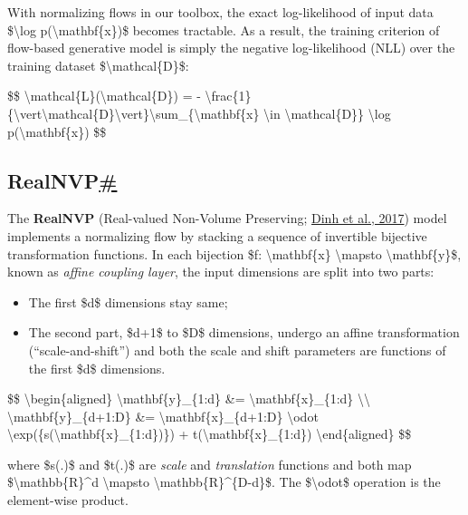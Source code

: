 With normalizing flows in our toolbox, the exact log-likelihood of input data \$\textbackslash log p(\textbackslash mathbf\{x\})\$ becomes tractable. As a result, the training criterion of flow-based generative model is simply the negative log-likelihood (NLL) over the training dataset \$\textbackslash mathcal\{D\}\$:

\$\$ \textbackslash mathcal\{L\}(\textbackslash mathcal\{D\}) = - \textbackslash frac\{1\}\{\textbackslash vert\textbackslash mathcal\{D\}\textbackslash vert\}\textbackslash sum\_\{\textbackslash mathbf\{x\} \textbackslash in \textbackslash mathcal\{D\}\} \textbackslash log p(\textbackslash mathbf\{x\}) \$\$

\subsection{\texorpdfstring{RealNVP\hyperref[realnvp]{\#}}{RealNVP\#}}\label{realnvp}

The \textbf{RealNVP} (Real-valued Non-Volume Preserving; \href{https://arxiv.org/abs/1605.08803}{Dinh et al., 2017}) model implements a normalizing flow by stacking a sequence of invertible bijective transformation functions. In each bijection \$f: \textbackslash mathbf\{x\} \textbackslash mapsto \textbackslash mathbf\{y\}\$, known as \emph{affine coupling layer}, the input dimensions are split into two parts:

\begin{itemize}
\tightlist
\item
  The first \$d\$ dimensions stay same;
\item
  The second part, \$d+1\$ to \$D\$ dimensions, undergo an affine transformation (``scale-and-shift'') and both the scale and shift parameters are functions of the first \$d\$ dimensions.
\end{itemize}

\$\$ \textbackslash begin\{aligned\} \textbackslash mathbf\{y\}\_\{1:d\} \&= \textbackslash mathbf\{x\}\_\{1:d\} \textbackslash\textbackslash{} \textbackslash mathbf\{y\}\_\{d+1:D\} \&= \textbackslash mathbf\{x\}\_\{d+1:D\} \textbackslash odot \textbackslash exp(\{s(\textbackslash mathbf\{x\}\_\{1:d\})\}) + t(\textbackslash mathbf\{x\}\_\{1:d\}) \textbackslash end\{aligned\} \$\$

where \$s(.)\$ and \$t(.)\$ are \emph{scale} and \emph{translation} functions and both map \$\textbackslash mathbb\{R\}\^{}d \textbackslash mapsto \textbackslash mathbb\{R\}\^{}\{D-d\}\$. The \$\textbackslash odot\$ operation is the element-wise product.

